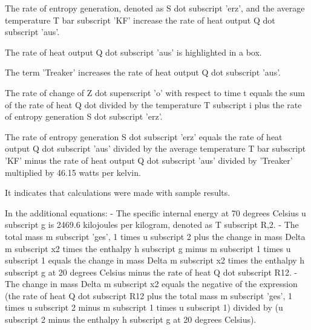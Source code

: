 The rate of entropy generation, denoted as S dot subscript 'erz', and the average temperature T bar subscript 'KF' increase the rate of heat output Q dot subscript 'aus'.

The rate of heat output Q dot subscript 'aus' is highlighted in a box.

The term 'Treaker' increases the rate of heat output Q dot subscript 'aus'.

The rate of change of Z dot superscript 'o' with respect to time t equals the sum of the rate of heat Q dot divided by the temperature T subscript i plus the rate of entropy generation S dot subscript 'erz'.

The rate of entropy generation S dot subscript 'erz' equals the rate of heat output Q dot subscript 'aus' divided by the average temperature T bar subscript 'KF' minus the rate of heat output Q dot subscript 'aus' divided by 'Treaker' multiplied by 46.15 watts per kelvin.

It indicates that calculations were made with sample results.

In the additional equations:
- The specific internal energy at 70 degrees Celsius u subscript g is 2469.6 kilojoules per kilogram, denoted as T subscript R,2.
- The total mass m subscript 'ges', 1 times u subscript 2 plus the change in mass Delta m subscript x2 times the enthalpy h subscript g minus m subscript 1 times u subscript 1 equals the change in mass Delta m subscript x2 times the enthalpy h subscript g at 20 degrees Celsius minus the rate of heat Q dot subscript R12.
- The change in mass Delta m subscript x2 equals the negative of the expression (the rate of heat Q dot subscript R12 plus the total mass m subscript 'ges', 1 times u subscript 2 minus m subscript 1 times u subscript 1) divided by (u subscript 2 minus the enthalpy h subscript g at 20 degrees Celsius).